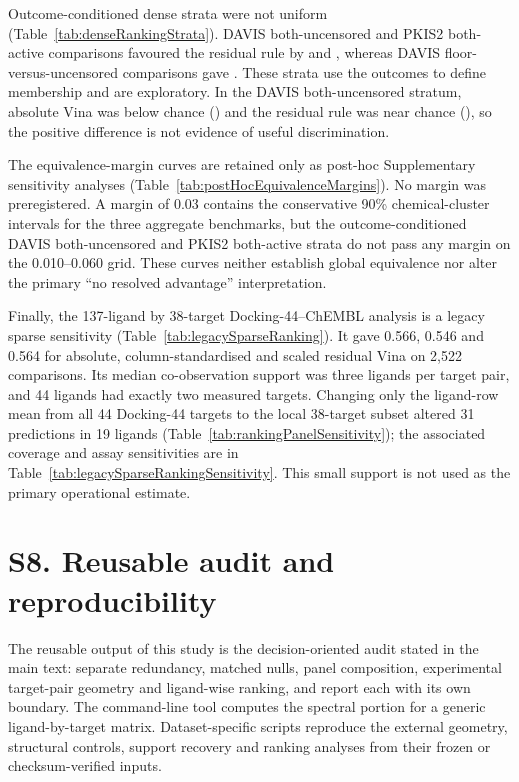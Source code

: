 \documentclass[11pt]{article}
\begin{document}
Outcome-conditioned dense strata were not uniform (Table~\ref{tab:denseRankingStrata}).
DAVIS both-uncensored and PKIS2 both-active comparisons favoured the residual rule by
\DenseDavisBinderDelta{} and \DensePkisTwoBothActiveDelta{}, whereas DAVIS
floor-versus-uncensored comparisons gave \DenseDavisFloorDetectionDelta{}. These strata use
the outcomes to define membership and are exploratory. In the DAVIS both-uncensored stratum,
absolute Vina was below chance (\DenseDavisBinderAbsolute{}) and the residual rule was near
chance (\DenseDavisBinderResidual{}), so the positive difference is not evidence of useful
discrimination.

The equivalence-margin curves are retained only as post-hoc Supplementary sensitivity
analyses (Table~\ref{tab:postHocEquivalenceMargins}). No margin was preregistered. A margin
of 0.03 contains the conservative 90\% chemical-cluster intervals for the three aggregate
benchmarks, but the outcome-conditioned DAVIS both-uncensored and PKIS2 both-active strata
do not pass any margin on the 0.010--0.060 grid. These curves neither establish global
equivalence nor alter the primary ``no resolved advantage'' interpretation.

Finally, the 137-ligand by 38-target Docking-44--ChEMBL analysis is a legacy sparse
sensitivity (Table~\ref{tab:legacySparseRanking}). It gave 0.566, 0.546 and 0.564 for
absolute, column-standardised and scaled residual Vina on 2,522 comparisons. Its median
co-observation support was three ligands per target pair, and 44 ligands had exactly two
measured targets. Changing only the ligand-row mean from all 44 Docking-44 targets to the
local 38-target subset altered 31 predictions in 19 ligands
(Table~\ref{tab:rankingPanelSensitivity}); the associated coverage and assay sensitivities
are in Table~\ref{tab:legacySparseRankingSensitivity}. This small support is not used as the
primary operational estimate.

\section*{S8. Reusable audit and reproducibility}

The reusable output of this study is the decision-oriented audit stated in the main text:
separate redundancy, matched nulls, panel composition, experimental target-pair geometry and
ligand-wise ranking, and report each with its own boundary. The command-line tool computes
the spectral portion for a generic ligand-by-target matrix. Dataset-specific scripts reproduce the external geometry,
structural controls, support recovery and ranking analyses from their frozen or
checksum-verified inputs.
\end{document}
